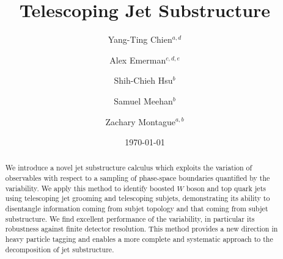 \documentclass[aps,prl,floatfix,preprintnumbers,twocolumn,groupedaddress,nofootinbib]{revtex4-1}
\begin{document}
\title{Telescoping Jet Substructure}

\author{Yang-Ting Chien$^{a,d}$}

\author{Alex Emerman$^{c,d,e}$}

\author{Shih-Chieh Hsu$^b$}

\author{Samuel Meehan$^b$}

\author{Zachary Montague$^{a,b}$}


\date{\today}
\linenumbers

\begin{abstract}
We introduce a novel jet substructure calculus which exploits the variation of observables with respect to a sampling of phase-space boundaries quantified by the variability. We apply this method to identify boosted $W$ boson and top quark jets using telescoping jet grooming and telescoping subjets, demonstrating its ability to disentangle information coming from subjet topology and that coming from subjet substructure. We find excellent performance of the variability, in particular its robustness against finite detector resolution. This method provides a new direction in heavy particle tagging and enables a more complete and systematic approach to the decomposition of jet substructure.
\end{abstract}
\maketitle
\end{document}
